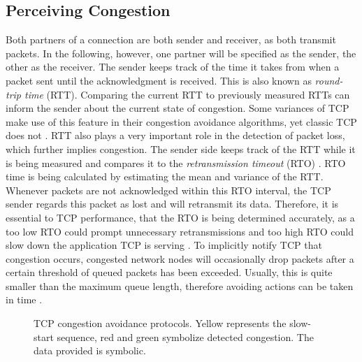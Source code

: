\documentclass[a4paper,conference]{IEEEtran}
\begin{document}
\subsection{Perceiving Congestion}
\label{sec:P_C_marker}
Both partners of a connection are both sender and receiver, as both transmit packets. In the following, however, one partner will be specified as the sender, the other as the receiver. The sender keeps track of the time it takes from when a packet sent until the acknowledgment is received. This is also known as \textit{round-trip time} (RTT). Comparing the current RTT to previously measured RTTs can inform the sender about the current state of congestion. Some variances of TCP make use of this feature in their congestion avoidance algorithms, yet classic TCP does not \cite{huston2000tcp,jacobson1995congestion}. RTT also plays a very important role in the detection of packet loss, which further implies congestion. The sender side keeps track of the RTT while it is being measured and compares it to the \textit{retransmission timeout} (RTO) \cite{jacobson1992tcp}. RTO time is being calculated by estimating the mean and variance of the RTT. Whenever packets are not acknowledged within this RTO interval, the TCP sender regards this packet as lost and will retransmit its data. Therefore, it is essential to TCP performance, that the RTO is being determined accurately, as a too low RTO could prompt unnecessary retransmissions and too high RTO could slow down the application TCP is serving \cite{huston2000tcp,jacobson1995congestion}. To implicitly notify TCP that congestion occurs, congested network nodes will occasionally drop packets after a certain threshold of queued packets has been exceeded. Usually, this is quite smaller than the maximum queue length, therefore avoiding actions can be taken in time \cite{ramakrishnan1999proposal}.

\begin{figure}
  \centering
  \caption{TCP congestion avoidance protocols. Yellow represents the slow-start sequence, red and green symbolize detected congestion. The data provided is symbolic.}
  \label{fig:tcp_congestion_avoidance_protocols}
\end{figure}
\end{document}
